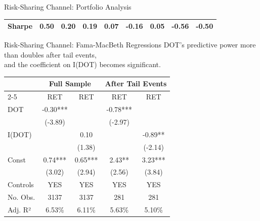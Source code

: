 \documentclass[11pt, aspectratio=169]{beamer}
\begin{document}
\begin{frame}{Risk-Sharing Channel: Portfolio Analysis}
{\begin{tabular}{lcccccccc}
Sharpe & 0.50 & 0.20 & 0.19 & 0.07 & -0.16 & 0.05 & -0.56 & -0.50 \\ \hline
\end{tabular}
}
\end{frame}

\begin{frame}{Risk-Sharing Channel: Fama-MacBeth Regressions}
\centering
DOT’s predictive power more than \alert{doubles} after tail events, \\
and the coefficient on I(DOT) becomes \alert{significant}. \\
\bigskip
\begin{tabular}{lcccc}
\hline
\multicolumn{1}{c}{} & \multicolumn{2}{c}{Full Sample} & \multicolumn{2}{c}{After Tail Events} \\ \cline{2-5} 
 & RET & RET & RET & RET \\ \hline
DOT & -0.30*** &  & -0.78*** &  \\
 & (-3.89) &  & (-2.97) &  \\
I(DOT) &  & \cellcolor[HTML]{FFCE93}0.10 &  & \cellcolor[HTML]{FFCE93}-0.89** \\
 &  & \cellcolor[HTML]{FFCE93}(1.38) &  & \cellcolor[HTML]{FFCE93}(-2.14) \\
Const & \cellcolor[HTML]{FFCE93}0.74*** & 0.65*** & \cellcolor[HTML]{FFCE93}2.43** & 3.23*** \\
 & \cellcolor[HTML]{FFCE93}(3.02) & (2.94) & \cellcolor[HTML]{FFCE93}(2.56) & (3.84) \\ \hline
Controls & YES & YES & YES & YES \\
No. Obs. & 3137 & 3137 & 281 & 281 \\
Adj. R² & 6.53\% & 6.11\% & 5.63\% & 5.10\% \\ \hline
\end{tabular}\\
\end{frame}
\end{document}
